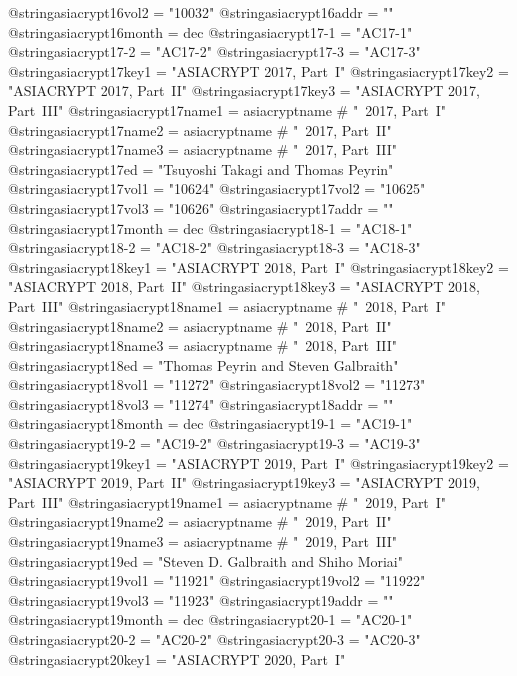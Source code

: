 @string{asiacrypt16vol2 =       "10032"}
@string{asiacrypt16addr =       ""}
@string{asiacrypt16month =      dec}
@string{asiacrypt17-1 =         "AC17-1"}
@string{asiacrypt17-2 =         "AC17-2"}
@string{asiacrypt17-3 =         "AC17-3"}
@string{asiacrypt17key1 =       "ASIACRYPT 2017, Part~I"}
@string{asiacrypt17key2 =       "ASIACRYPT 2017, Part~II"}
@string{asiacrypt17key3 =       "ASIACRYPT 2017, Part~III"}
@string{asiacrypt17name1 =      asiacryptname # "~2017, Part~I"}
@string{asiacrypt17name2 =      asiacryptname # "~2017, Part~II"}
@string{asiacrypt17name3 =      asiacryptname # "~2017, Part~III"}
@string{asiacrypt17ed =         "Tsuyoshi Takagi and Thomas Peyrin"}
@string{asiacrypt17vol1 =       "10624"}
@string{asiacrypt17vol2 =       "10625"}
@string{asiacrypt17vol3 =       "10626"}
@string{asiacrypt17addr =       ""}
@string{asiacrypt17month =      dec}
@string{asiacrypt18-1 =         "AC18-1"}
@string{asiacrypt18-2 =         "AC18-2"}
@string{asiacrypt18-3 =         "AC18-3"}
@string{asiacrypt18key1 =       "ASIACRYPT 2018, Part~I"}
@string{asiacrypt18key2 =       "ASIACRYPT 2018, Part~II"}
@string{asiacrypt18key3 =       "ASIACRYPT 2018, Part~III"}
@string{asiacrypt18name1 =      asiacryptname # "~2018, Part~I"}
@string{asiacrypt18name2 =      asiacryptname # "~2018, Part~II"}
@string{asiacrypt18name3 =      asiacryptname # "~2018, Part~III"}
@string{asiacrypt18ed =         "Thomas Peyrin and Steven Galbraith"}
@string{asiacrypt18vol1 =       "11272"}
@string{asiacrypt18vol2 =       "11273"}
@string{asiacrypt18vol3 =       "11274"}
@string{asiacrypt18addr =       ""}
@string{asiacrypt18month =      dec}
@string{asiacrypt19-1 =         "AC19-1"}
@string{asiacrypt19-2 =         "AC19-2"}
@string{asiacrypt19-3 =         "AC19-3"}
@string{asiacrypt19key1 =       "ASIACRYPT 2019, Part~I"}
@string{asiacrypt19key2 =       "ASIACRYPT 2019, Part~II"}
@string{asiacrypt19key3 =       "ASIACRYPT 2019, Part~III"}
@string{asiacrypt19name1 =      asiacryptname # "~2019, Part~I"}
@string{asiacrypt19name2 =      asiacryptname # "~2019, Part~II"}
@string{asiacrypt19name3 =      asiacryptname # "~2019, Part~III"}
@string{asiacrypt19ed =         "Steven D. Galbraith and Shiho Moriai"}
@string{asiacrypt19vol1 =       "11921"}
@string{asiacrypt19vol2 =       "11922"}
@string{asiacrypt19vol3 =       "11923"}
@string{asiacrypt19addr =       ""}
@string{asiacrypt19month =      dec}
@string{asiacrypt20-1 =         "AC20-1"}
@string{asiacrypt20-2 =         "AC20-2"}
@string{asiacrypt20-3 =         "AC20-3"}
@string{asiacrypt20key1 =       "ASIACRYPT 2020, Part~I"}
